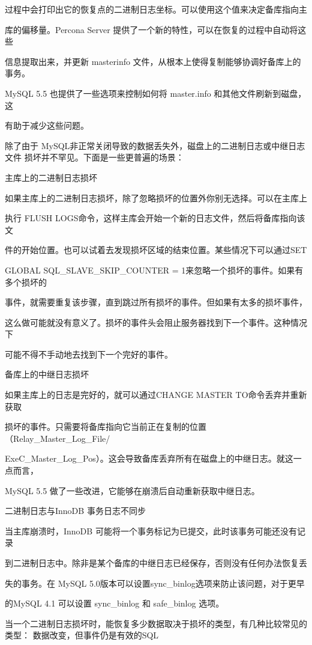 过程中会打印出它的恢复点的二进制日志坐标。可以使用这个值来决定备库指向主

库的偏移量。Percona Server 提供了一个新的特性，可以在恢复的过程中自动将这些

信息提取出来，并更新 masterinfo 文件，从根本上使得复制能够协调好备库上的事务。

MySQL 5.5 也提供了一些选项来控制如何将 master.info 和其他文件刷新到磁盘，这

有助于减少这些问题。

除了由于 MySQL非正常关闭导致的数据丢失外，磁盘上的二进制日志或中继日志文件
损坏并不罕见。下面是一些更普遍的场景：

主库上的二进制日志损坏

如果主库上的二进制日志损坏，除了忽略损坏的位置外你别无选择。可以在主库上

执行 FLUSH LOGS命令，这样主库会开始一个新的日志文件，然后将备库指向该文

件的开始位置。也可以试着去发现损坏区域的结束位置。某些情况下可以通过SET

GLOBAL SQL\_SLAVE\_SKIP\_COUNTER = 1来忽略一个损坏的事件。如果有多个损坏的

事件，就需要重复该步骤，直到跳过所有损坏的事件。但如果有太多的损坏事件，

这么做可能就没有意义了。损坏的事件头会阻止服务器找到下一个事件。这种情况下

可能不得不手动地去找到下一个完好的事件。

备库上的中继日志损坏

如果主库上的日志是完好的，就可以通过CHANGE MASTER TO命令丢弃并重新获取

损坏的事件。只需要将备库指向它当前正在复制的位置（Relay\_Master\_Log\_File/

ExeC\_Master\_Log\_Pos）。这会导致备库丢弃所有在磁盘上的中继日志。就这一点而言，

MySQL 5.5 做了一些改进，它能够在崩溃后自动重新获取中继日志。

二进制日志与InnoDB 事务日志不同步

当主库崩溃时，InnoDB 可能将一个事务标记为已提交，此时该事务可能还没有记录

到二进制日志中。除非是某个备库的中继日志已经保存，否则没有任何办法恢复丢

失的事务。在 MySQL 5.0版本可以设置sync\_binlog选项来防止该问题，对于更早

的MySQL 4.1 可以设置 sync\_binlog 和 safe\_binlog 选项。

当一个二进制日志损坏时，能恢复多少数据取决于损坏的类型，有几种比较常见的类型：
数据改变，但事件仍是有效的SQL

